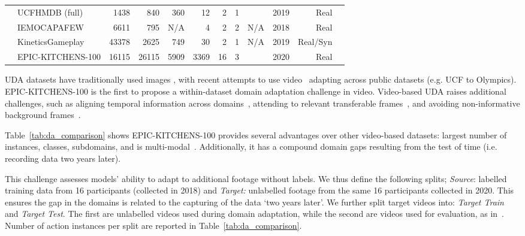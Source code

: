 \documentclass[twocolumn]{svjour3}          \smartqed
\makeatletter
\newcommand{\chParagraph}[1]{\noindent {\textbf{#1.}} \hspace{6pt}}
\newcommand {\newDataset} {EPIC-KITCHENS-100}
\newcommand*{\eg}{e.g.\@\xspace}
\newcommand*{\ie}{i.e.\@\xspace}
\makeatother
\begin{document}
\begin{table*}[t!]
\begin{center}
{\begin{tabular}{llrrrrrrrrrr}
    & UCFHMDB (full) \cite{Chen2019}    & 1438  & 840 & 360 & 12     & 2 & 1 & \hspace{30pt} & 2019   & Real\\
    & IEMOCAPAFEW \cite{qi2018unified} & 6611 &  795 & N/A & 4 & 2 & 2 & N/A\hspace{30pt} & 2018  & Real \\
    & KineticsGameplay \cite{Chen2019}  & 43378 & 2625 & 749 & 30     & 2 & 1 & N/A\hspace{30pt} & 2019    & Real/Syn \\
    & \newDataset         & 16115 & 26115 & 5909 & 3369       & 16 & 3 & \hspace{30pt} & 2020    & Real\\
    \bottomrule
    \end{tabular}
    }
\end{center}
\end{table*}

\chParagraph{Related Datasets}
UDA datasets have traditionally used images \cite{Saenko2010,Venkateswara2017,Peng2017,Peng2019}, with recent attempts to use video~ \cite{jamal2018deep,Chen2019,qi2018unified} adapting across public datasets (\eg UCF to Olympics). \newDataset{} is the first to propose a within-dataset domain adaptation challenge in video.
Video-based UDA raises additional challenges, such as aligning temporal information across domains~\cite{jamal2018deep}, attending to relevant transferable frames~\cite{Chen2019}, and avoiding non-informative background frames~\cite{pan2019adversarial}.  

Table~\ref{tab:da_comparison} shows 
\newDataset{} provides 
several advantages over other video-based datasets: largest number of instances, classes, subdomains, and is multi-modal~\cite{munro2020multi}.  
Additionally, it has a compound domain gaps resulting from the test of time (\ie recording data two years later).

\chParagraph{Splits}
This challenge assesses models' ability to adapt to additional footage without labels. We thus define the following splits; \textit{Source}: labelled training data from 16 participants (collected in 2018) and \textit{Target:} unlabelled footage from the same 16 participants collected in 2020. This ensures the gap in the domains is related to the capturing of the data `two years later'. We further split target videos into: \textit{Target Train} and \textit{Target Test}. The first are unlabelled videos used during domain adaptation, while the second are videos used for evaluation, as in~\cite{Peng2017}. Number of action instances per split are reported in Table~\ref{tab:da_comparison}. 
\end{document}
